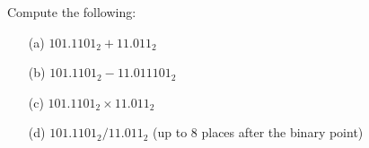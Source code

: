 Compute the following:
\begin{enumerate}
\item[(a)] $101.1101_2 + 11.011_2$
\item[(b)] $101.1101_2 - 11.011101_2$
\item[(c)] $101.1101_2 \times 11.011_2$
\item[(d)] $101.1101_2 / 11.011_2$ (up to 8 places after the binary point)
\end{enumerate}
